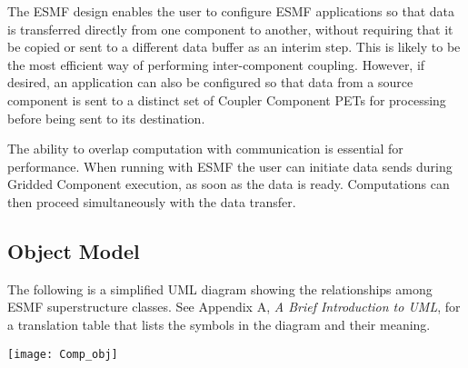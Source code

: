 The ESMF design enables the user to configure ESMF
applications so that data is transferred directly from one component 
to another, without requiring that it be copied or sent to a different data
buffer as an interim step.  This is likely to be the most efficient way 
of performing inter-component coupling.  However, if desired, an 
application can also be configured so that data from a source component 
is sent to a distinct set of Coupler Component PETs for processing 
before being sent to its destination.

The ability to overlap computation with communication is essential for
performance.  When running with ESMF the user can initiate data 
sends during Gridded Component execution, as soon as the data is ready.
Computations can then proceed simultaneously with the data transfer.

\newpage
\subsection{Object Model}

The following is a simplified UML diagram showing the relationships among
ESMF superstructure classes.  See Appendix A, {\it A Brief Introduction 
to UML}, for a translation table that lists the symbols in the diagram 
and their meaning.

\begin{center}
\texttt{[image: Comp\_obj]}   
\end{center}



